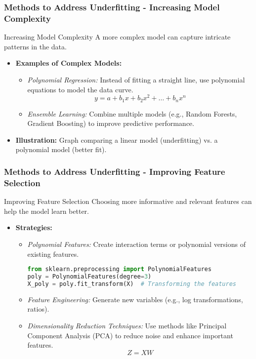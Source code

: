 \documentclass[aspectratio=169]{beamer}
\begin{document}
\begin{frame}[fragile]
    \frametitle{Methods to Address Underfitting - Increasing Model Complexity}
    \begin{block}{Increasing Model Complexity}
        A more complex model can capture intricate patterns in the data.
    \end{block}

    \begin{itemize}
        \item \textbf{Examples of Complex Models:}
        \begin{itemize}
            \item \textit{Polynomial Regression:} Instead of fitting a straight line, use polynomial equations to model the data curve.
            \begin{equation}
                y = a + b_1x + b_2x^2 + \ldots + b_nx^n
            \end{equation}
            \item \textit{Ensemble Learning:} Combine multiple models (e.g., Random Forests, Gradient Boosting) to improve predictive performance.
        \end{itemize}
        \item \textbf{Illustration:} Graph comparing a linear model (underfitting) vs. a polynomial model (better fit).
    \end{itemize}
\end{frame}

\begin{frame}[fragile]
    \frametitle{Methods to Address Underfitting - Improving Feature Selection}
    \begin{block}{Improving Feature Selection}
        Choosing more informative and relevant features can help the model learn better.
    \end{block}

    \begin{itemize}
        \item \textbf{Strategies:}
        \begin{itemize}
            \item \textit{Polynomial Features:} Create interaction terms or polynomial versions of existing features.
            \begin{lstlisting}[language=Python]
from sklearn.preprocessing import PolynomialFeatures
poly = PolynomialFeatures(degree=3)
X_poly = poly.fit_transform(X)  # Transforming the features
            \end{lstlisting}
            \item \textit{Feature Engineering:} Generate new variables (e.g., log transformations, ratios).
            \item \textit{Dimensionality Reduction Techniques:} Use methods like Principal Component Analysis (PCA) to reduce noise and enhance important features.
            \begin{equation}
                Z = XW
            \end{equation}
            \end{itemize}
        \end{itemize}
\end{frame}
\end{document}
